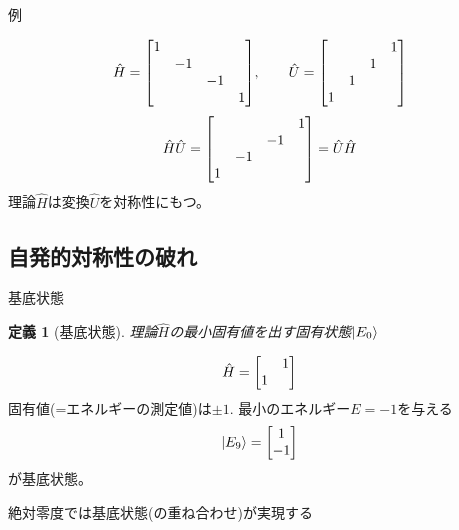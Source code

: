 \documentclass[dvipdfm]{beamer}
\newtheorem*{defn}{定義}
\begin{document}
\begin{frame}{例}
    \begin{example}
        \begin{equation*}
            \hat{H}=\mqty[\dmat{1,-1,-1,1}],
            \qquad
            \hat{U}=\mqty[ & & & 1 \\ & & 1 & \\ & 1 & & \\ 1 & & & ]
        \end{equation*}
        \begin{equation*}
            \hat{H}\hat{U}
            =
            \mqty[ & & & 1 \\ & & -1 & \\ & -1 & & \\ 1 & & & ]
            =
            \hat{U}\hat{H}
        \end{equation*}
        理論$\hat{H}$は変換$\hat{U}$を対称性にもつ。
    \end{example}
\end{frame}


\subsection{自発的対称性の破れ}

\begin{frame}{基底状態}
    \begin{defn}[基底状態]
        理論$\hat{H}$の最小固有値を出す固有状態$\ket{E_0}$
    \end{defn}
    \begin{example}
        \begin{equation*}
            \hat{H}=\mqty[ & 1 \\ 1 & ]
        \end{equation*}
        固有値(=エネルギーの測定値)は$\pm1$.
        最小のエネルギー$E=-1$を与える
        \begin{equation*}
            \ket{E_9}=\mqty[1 \\ -1]
        \end{equation*}
        が基底状態。
    \end{example}
    絶対零度では基底状態(の重ね合わせ)が実現する
\end{frame}
\end{document}
